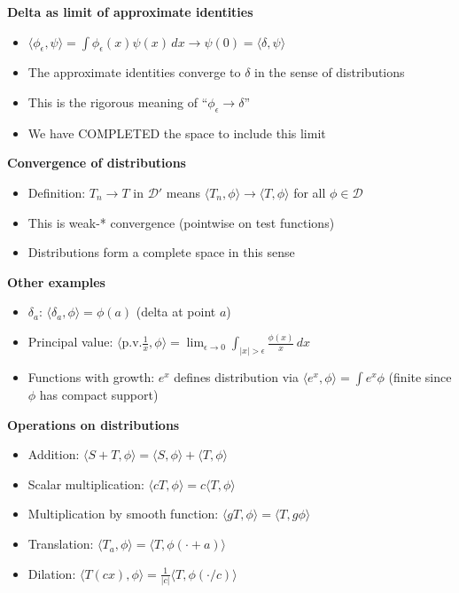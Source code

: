 \documentclass[
  10pt,
  letterpaper,
]{scrbook}
\providecommand{\tightlist}{%
  \setlength{\itemsep}{0pt}\setlength{\parskip}{0pt}}
\begin{document}
\textbf{Delta as limit of approximate identities}

\begin{itemize}
\tightlist
\item
  \(\langle \phi_\epsilon, \psi \rangle = \int \phi_\epsilon(x) \psi(x)\, dx \to \psi(0) = \langle \delta, \psi \rangle\)
\item
  The approximate identities converge to \(\delta\) in the sense of
  distributions
\item
  This is the rigorous meaning of ``\(\phi_\epsilon \to \delta\)''
\item
  We have COMPLETED the space to include this limit
\end{itemize}

\textbf{Convergence of distributions}

\begin{itemize}
\tightlist
\item
  Definition: \(T_n \to T\) in \(\mathcal{D}'\) means
  \(\langle T_n, \phi \rangle \to \langle T, \phi \rangle\) for all
  \(\phi \in \mathcal{D}\)
\item
  This is weak-* convergence (pointwise on test functions)
\item
  Distributions form a complete space in this sense
\end{itemize}

\textbf{Other examples}

\begin{itemize}
\tightlist
\item
  \(\delta_a\): \(\langle \delta_a, \phi \rangle = \phi(a)\) (delta at
  point \(a\))
\item
  Principal value:
  \(\langle \text{p.v.}\frac{1}{x}, \phi \rangle = \lim_{\epsilon \to 0} \int_{|x| > \epsilon} \frac{\phi(x)}{x}\, dx\)
\item
  Functions with growth: \(e^{x}\) defines distribution via
  \(\langle e^x, \phi \rangle = \int e^x \phi\) (finite since \(\phi\)
  has compact support)
\end{itemize}

\textbf{Operations on distributions}

\begin{itemize}
\tightlist
\item
  Addition:
  \(\langle S + T, \phi \rangle = \langle S, \phi \rangle + \langle T, \phi \rangle\)
\item
  Scalar multiplication:
  \(\langle cT, \phi \rangle = c\langle T, \phi \rangle\)
\item
  Multiplication by smooth function:
  \(\langle gT, \phi \rangle = \langle T, g\phi \rangle\)
\item
  Translation:
  \(\langle T_a, \phi \rangle = \langle T, \phi(\cdot + a) \rangle\)
\item
  Dilation:
  \(\langle T(cx), \phi \rangle = \frac{1}{|c|}\langle T, \phi(\cdot/c) \rangle\)
\end{itemize}
\end{document}
